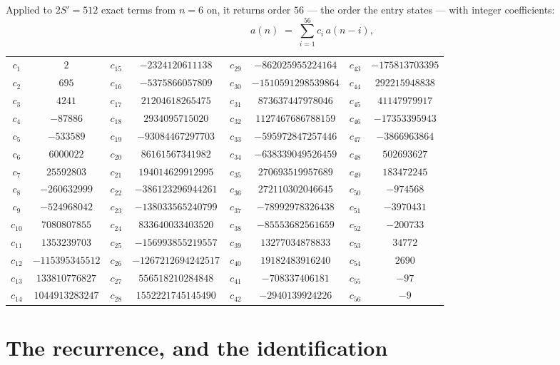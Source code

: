 \documentclass[11pt,a4paper]{article}
\theoremstyle{plain}
\theoremstyle{definition}
\begin{document}
Applied to $2S'=512$ exact terms from $n=6$ on, it returns order $56$ --- the
order the entry states --- with integer coefficients:
\[
a(n)\;=\;\sum_{i=1}^{56}c_i\,a(n-i),
\]
\begin{center}\small
\begin{tabular}{cccccccc}
$c_{1}$ & $2$ & $c_{15}$ & $-2324120611138$ & $c_{29}$ & $-862025955224164$ & $c_{43}$ & $-175813703395$ \\
$c_{2}$ & $695$ & $c_{16}$ & $-5375866057809$ & $c_{30}$ & $-1510591298539864$ & $c_{44}$ & $292215948838$ \\
$c_{3}$ & $4241$ & $c_{17}$ & $21204618265475$ & $c_{31}$ & $873637447978046$ & $c_{45}$ & $41147979917$ \\
$c_{4}$ & $-87886$ & $c_{18}$ & $2934095715020$ & $c_{32}$ & $1127467686788159$ & $c_{46}$ & $-17353395943$ \\
$c_{5}$ & $-533589$ & $c_{19}$ & $-93084467297703$ & $c_{33}$ & $-595972847257446$ & $c_{47}$ & $-3866963864$ \\
$c_{6}$ & $6000022$ & $c_{20}$ & $86161567341982$ & $c_{34}$ & $-638339049526459$ & $c_{48}$ & $502693627$ \\
$c_{7}$ & $25592803$ & $c_{21}$ & $194014629912995$ & $c_{35}$ & $270693519957689$ & $c_{49}$ & $183472245$ \\
$c_{8}$ & $-260632999$ & $c_{22}$ & $-386123296944261$ & $c_{36}$ & $272110302046645$ & $c_{50}$ & $-974568$ \\
$c_{9}$ & $-524968042$ & $c_{23}$ & $-138033565240799$ & $c_{37}$ & $-78992978326438$ & $c_{51}$ & $-3970431$ \\
$c_{10}$ & $7080807855$ & $c_{24}$ & $833640033403520$ & $c_{38}$ & $-85553682561659$ & $c_{52}$ & $-200733$ \\
$c_{11}$ & $1353239703$ & $c_{25}$ & $-156993855219557$ & $c_{39}$ & $13277034878833$ & $c_{53}$ & $34772$ \\
$c_{12}$ & $-115395345512$ & $c_{26}$ & $-1267212694242517$ & $c_{40}$ & $19182483916240$ & $c_{54}$ & $2690$ \\
$c_{13}$ & $133810776827$ & $c_{27}$ & $556518210284848$ & $c_{41}$ & $-708337406181$ & $c_{55}$ & $-97$ \\
$c_{14}$ & $1044913283247$ & $c_{28}$ & $1552221745145490$ & $c_{42}$ & $-2940139924226$ & $c_{56}$ & $-9$ \\
\end{tabular}
\end{center}

\section{The recurrence, and the identification}
\end{document}

